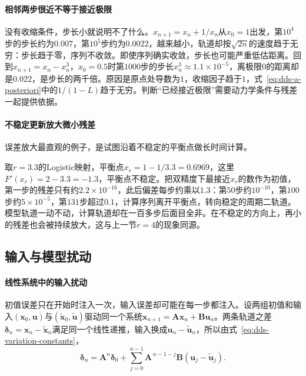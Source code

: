 \paragraph{相邻两步很近不等于接近极限}
没有收缩条件，步长小就说明不了什么。$x_{n+1}=x_n+1/x_n$从$x_0=1$出发，第$10^4$步的步长约为$0.007$，第$10^5$步约为$0.0022$，越来越小，轨道却按$\sqrt{2n}$的速度趋于无穷：步长趋于零，序列不收敛。即使序列确实收敛，步长也可能严重低估距离。回到$x_{n+1}=x_n-x_n^3$，$x_0=0.5$时第$1000$步的步长$x_n^3\approx1.1\times10^{-5}$，离极限$0$的距离却是$0.022$，是步长的两千倍。原因是原点处导数为$1$，收缩因子趋于$1$，式~\eqref{eq:dds-a-posteriori}中的$1/(1-L)$趋于无穷。判断“已经接近极限”需要动力学条件与残差一起提供依据。

\paragraph{不稳定更新放大微小残差}
误差放大最直观的例子，是试图沿着不稳定的平衡点做长时间计算。

\begin{example}[从不稳定平衡点出发的浮点计算]
\label{ex:dds-unstable-fixed-point}
取$r=3.3$的Logistic映射，平衡点$x_r=1-1/3.3=0.69\overline{69}$，这里$F'(x_r)=2-3.3=-1.3$，平衡点不稳定。把双精度下最接近$x_r$的数作为初值，第一步的残差只有约$2.2\times10^{-16}$，此后偏差每步约乘以$1.3$：第$50$步约$10^{-10}$，第$100$步约$5\times10^{-5}$，第$131$步超过$0.1$，计算序列离开平衡点，转向稳定的周期二轨道。模型轨道一动不动，计算轨道却在一百多步后面目全非。在不稳定的方向上，再小的残差也会被持续放大，这与上一节$r=4$的现象同源。
\end{example}

\subsection{输入与模型扰动}
\label{sec:dds-input-model-perturbation}

\paragraph{线性系统中的输入扰动}
初值误差只在开始时注入一次，输入误差却可能在每一步都注入。设两组初值和输入$(\bm x_0,\bm u)$与$(\tilde{\bm x}_0,\tilde{\bm u})$驱动同一个系统$\bm x_{n+1}=\bm A\bm x_n+\bm B\bm u_n$。两条轨道之差$\bm\delta_n=\bm x_n-\tilde{\bm x}_n$满足同一个线性递推，输入换成$\bm u_n-\tilde{\bm u}_n$，所以由式~\eqref{eq:dds-variation-constants}，
\[
  \bm\delta_n=\bm A^n\bm\delta_0+\sum_{j=0}^{n-1}\bm A^{\,n-1-j}\bm B(\bm u_j-\tilde{\bm u}_j).
\]

